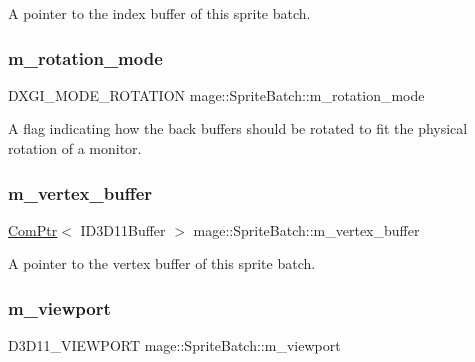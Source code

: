 A pointer to the index buffer of this sprite batch. \hypertarget{classmage_1_1_sprite_batch_ae062f178efe4a3af9c1573f8f8c4deee}{}\label{classmage_1_1_sprite_batch_ae062f178efe4a3af9c1573f8f8c4deee} 
\subsubsection{\texorpdfstring{m\+\_\+rotation\+\_\+mode}{m\_rotation\_mode}}
{\footnotesize\ttfamily D\+X\+G\+I\+\_\+\+M\+O\+D\+E\+\_\+\+R\+O\+T\+A\+T\+I\+ON mage\+::\+Sprite\+Batch\+::m\+\_\+rotation\+\_\+mode\hspace{0.3cm}{\ttfamily [private]}}

A flag indicating how the back buffers should be rotated to fit the physical rotation of a monitor. \hypertarget{classmage_1_1_sprite_batch_a748eb7f2f880e32ff4cfc0b7d6156de7}{}\label{classmage_1_1_sprite_batch_a748eb7f2f880e32ff4cfc0b7d6156de7} 
\subsubsection{\texorpdfstring{m\+\_\+vertex\+\_\+buffer}{m\_vertex\_buffer}}
{\footnotesize\ttfamily \hyperlink{namespacemage_ae74f374780900893caa5555d1031fd79}{Com\+Ptr}$<$ I\+D3\+D11\+Buffer $>$ mage\+::\+Sprite\+Batch\+::m\+\_\+vertex\+\_\+buffer\hspace{0.3cm}{\ttfamily [private]}}

A pointer to the vertex buffer of this sprite batch. \hypertarget{classmage_1_1_sprite_batch_a3029ab1ee01ccfc69fef88eb78d5bfc0}{}\label{classmage_1_1_sprite_batch_a3029ab1ee01ccfc69fef88eb78d5bfc0} 
\subsubsection{\texorpdfstring{m\+\_\+viewport}{m\_viewport}}
{\footnotesize\ttfamily D3\+D11\+\_\+\+V\+I\+E\+W\+P\+O\+RT mage\+::\+Sprite\+Batch\+::m\+\_\+viewport\hspace{0.3cm}{\ttfamily [private]}}

